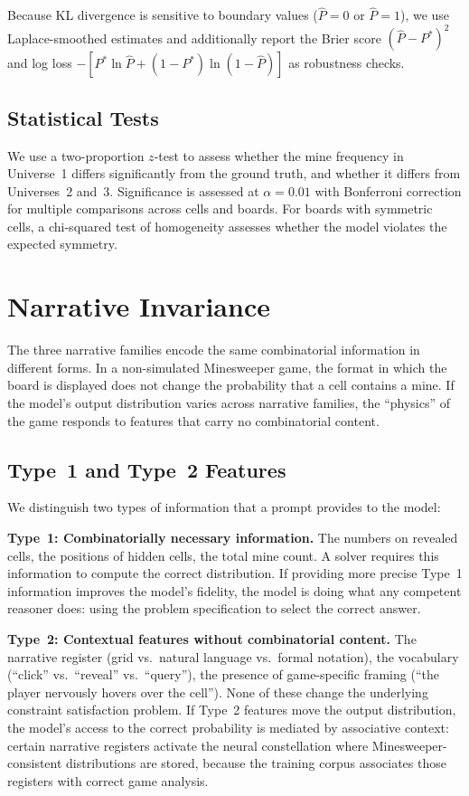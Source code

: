 \documentclass[12pt,a4paper]{article}
\begin{document}
Because KL divergence is sensitive to boundary values ($\hat{P} = 0$ or $\hat{P} = 1$), we use Laplace-smoothed estimates and additionally report the Brier score $(\hat{P} - P^*)^2$ and log loss $-[P^* \ln \hat{P} + (1-P^*) \ln(1-\hat{P})]$ as robustness checks.

\subsection{Statistical Tests}
\label{sec:stats}

We use a two-proportion $z$-test to assess whether the mine frequency in Universe~1 differs significantly from the ground truth, and whether it differs from Universes~2 and~3. Significance is assessed at $\alpha = 0.01$ with Bonferroni correction for multiple comparisons across cells and boards. For boards with symmetric cells, a chi-squared test of homogeneity assesses whether the model violates the expected symmetry.

\section{Narrative Invariance}
\label{sec:narrative}

The three narrative families encode the same combinatorial information in different forms. In a non-simulated Minesweeper game, the format in which the board is displayed does not change the probability that a cell contains a mine. If the model's output distribution varies across narrative families, the ``physics'' of the game responds to features that carry no combinatorial content.

\subsection{Type~1 and Type~2 Features}
\label{sec:type12}

We distinguish two types of information that a prompt provides to the model:

\textbf{Type~1: Combinatorially necessary information.} The numbers on revealed cells, the positions of hidden cells, the total mine count. A solver requires this information to compute the correct distribution. If providing more precise Type~1 information improves the model's fidelity, the model is doing what any competent reasoner does: using the problem specification to select the correct answer.

\textbf{Type~2: Contextual features without combinatorial content.} The narrative register (grid vs.\ natural language vs.\ formal notation), the vocabulary (``click'' vs.\ ``reveal'' vs.\ ``query''), the presence of game-specific framing (``the player nervously hovers over the cell''). None of these change the underlying constraint satisfaction problem. If Type~2 features move the output distribution, the model's access to the correct probability is mediated by associative context: certain narrative registers activate the neural constellation where Minesweeper-consistent distributions are stored, because the training corpus associates those registers with correct game analysis.
\end{document}
